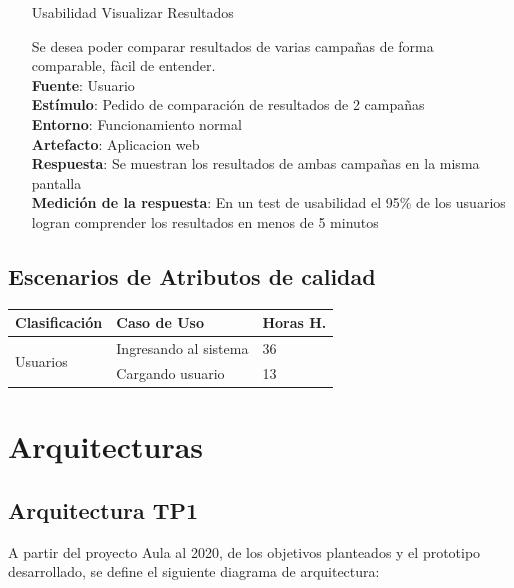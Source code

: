 \documentclass[a4paper, 11pt]{article}
\begin{document}
\begin{itemize}
\item[Usabilidad] Visualizar Resultados

Se desea poder comparar resultados de varias campañas de forma comparable, fàcil de entender. \\
\textbf{Fuente}: Usuario \\
\textbf{Estímulo}: Pedido de comparación de resultados de 2 campañas \\
\textbf{Entorno}: Funcionamiento normal \\
\textbf{Artefacto}: Aplicacion web \\
\textbf{Respuesta}: Se muestran los resultados de ambas campañas en la misma pantalla \\
\textbf{Medición de la respuesta}: En un test de usabilidad el 95\% de los usuarios logran comprender los resultados en menos de 5 minutos \\

\end{itemize}
\subsection{Escenarios de Atributos de calidad}
\begin{table}[H]
\centering
\begin{tabular}{ | p{5cm} | p{8cm} | p{1.5cm} | }
\hline
Clasificación & Caso de Uso & Horas H.\\ \hline \hline
\multirow{2}{5cm}{Usuarios} & Ingresando al sistema & 36 \\ \cline{2-3}
& Cargando usuario & 13 \\ \hline
\end{tabular}
\end{table}


\newpage

\section{Arquitecturas}
\subsection{Arquitectura TP1}
A partir del proyecto Aula al 2020, de los objetivos planteados y el prototipo desarrollado, se define el siguiente diagrama de arquitectura:
\end{document}

